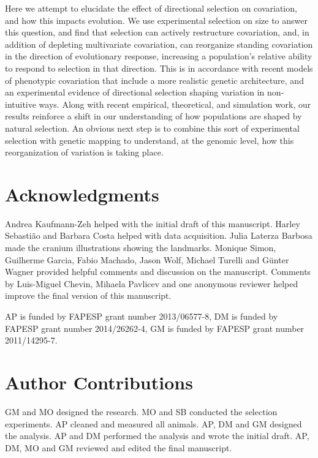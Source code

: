 \begin{refsection}
Here we attempt to elucidate the effect of directional selection on
covariation, and how this impacts evolution. We use experimental
selection on size to answer this question, and find that selection can
actively restructure covariation, and, in addition of depleting
multivariate covariation, can reorganize standing covariation in the
direction of evolutionary response, increasing a population's relative
ability to respond to selection in that direction. This is in accordance
with recent models of phenotypic covariation that include a more
realistic genetic architecture, and an experimental evidence of
directional selection shaping variation in non-intuitive ways. Along
with recent empirical, theoretical, and simulation work, our results
reinforce a shift in our understanding of how populations are shaped by
natural selection. An obvious next step is to combine this sort of
experimental selection with genetic mapping to understand, at the
genomic level, how this reorganization of variation is taking place.

\section*{Acknowledgments}\label{acknowledgments}

Andrea Kaufmann-Zeh helped with the initial draft of this manuscript.
Harley Sebastião and Barbara Costa helped with data acquisition. Julia
Laterza Barbosa made the cranium illustrations showing the landmarks.
Monique Simon, Guilherme Garcia, Fabio Machado, Jason Wolf, Michael
Turelli and Günter Wagner provided helpful comments and discussion on
the manuscript. Comments by Luis-Miguel Chevin, Mihaela Pavlicev and one
anonymous reviewer helped improve the final version of this manuscript.

AP is funded by FAPESP grant number 2013/06577-8, DM is funded by FAPESP
grant number 2014/26262-4, GM is funded by FAPESP grant number
2011/14295-7.

\section*{Author Contributions}

GM and MO designed the research. MO and SB conducted the selection
experiments. AP cleaned and measured all animals. AP, DM and GM designed
the analysis. AP and DM performed the analysis and wrote the initial
draft. AP, DM, MO and GM reviewed and edited the final manuscript.

\printbibliography


\end{refsection}
